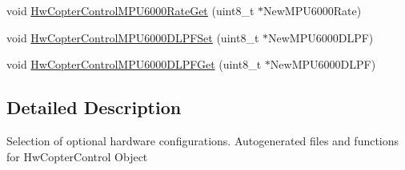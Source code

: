 \begin{DoxyCompactItemize}
\item 
void \hyperlink{group___hw_copter_control_ga3957e4ec11bac4e99b7f81938b681e3b}{\-Hw\-Copter\-Control\-M\-P\-U6000\-Rate\-Get} (uint8\-\_\-t $\ast$\-New\-M\-P\-U6000\-Rate)
\item 
void \hyperlink{group___hw_copter_control_ga887b762b05d7bbedf4ae82957c553d80}{\-Hw\-Copter\-Control\-M\-P\-U6000\-D\-L\-P\-F\-Set} (uint8\-\_\-t $\ast$\-New\-M\-P\-U6000\-D\-L\-P\-F)
\item 
void \hyperlink{group___hw_copter_control_ga243eedf550cdc89a6015d00adca6fb04}{\-Hw\-Copter\-Control\-M\-P\-U6000\-D\-L\-P\-F\-Get} (uint8\-\_\-t $\ast$\-New\-M\-P\-U6000\-D\-L\-P\-F)
\end{DoxyCompactItemize}


\subsection{\-Detailed \-Description}
\-Selection of optional hardware configurations. \-Autogenerated files and functions for \-Hw\-Copter\-Control \-Object 

